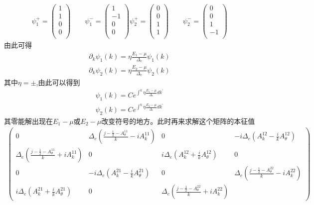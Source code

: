 \documentclass[22pt]{article}
\begin{document}
\begin{align}
	\psi_{1}^{+} = \begin{pmatrix}
		1\\
		1\\
		0\\
		0\\
	\end{pmatrix}
\qquad
\psi_{1}^{-} = \begin{pmatrix}
	1\\
	-1\\
	0\\
	0\\
\end{pmatrix}
	\psi_{2}^{+} = \begin{pmatrix}
	0\\
	0\\
	1\\
	1\\
\end{pmatrix}
\qquad
\psi_{2}^{-} = \begin{pmatrix}
	0\\
	0\\
	1\\
	-1\\
\end{pmatrix}
\end{align}
由此可得
\begin{align}
	\partial_k\psi_1(k)=\eta\frac{E_1-\mu}{\Delta_e}\psi_1(k)\\
	\partial_k\psi_2(k)=\eta\frac{E_2-\mu}{\Delta_e}\psi_2(k)
\end{align}
其中$\eta=\pm$,由此可以得到
\begin{align}
		\psi_1(k)=Ce^{\int^k\eta\frac{E_1-\mu}{\Delta_e}dk^{'}}\\
		\psi_2(k)=Ce^{\int^k\eta\frac{E_2-\mu}{\Delta_e}dk^{'}}
\end{align}
其零能解出现在$E_1-\mu$或$E_2-\mu$改变符号的地方。此时再来求解这个矩阵的本征值
\begin{align}
	\begin{pmatrix}
		0&\Delta_e(\frac{j-\frac{1}{2}-A_{\theta}^{11}}{k}-iA_k^{11})&0&-i\Delta_e(A_k^{12}-\frac{i}{k}A_{\theta}^{12})\\
		\Delta_e(\frac{j-\frac{1}{2}-A_{\theta}^{11}}{k}+iA_k^{11})&0&i\Delta_e(A_k^{12}+\frac{i}{k}A_{\theta}^{12})&0\\
		0&-i\Delta_e(A_k^{21}-\frac{i}{k}A_{\theta}^{21})&0&\Delta_e(\frac{j-\frac{1}{2}-A_{\theta}^{22}}{k}-iA_k^{22})\\
		i\Delta_e(A_k^{21}+\frac{i}{k}A_{\theta}^{21})&0&\Delta_e(\frac{j-\frac{1}{2}-A_{\theta}^{22}}{k}+iA_k^{22})
	\end{pmatrix}
\end{align}
\end{document}
